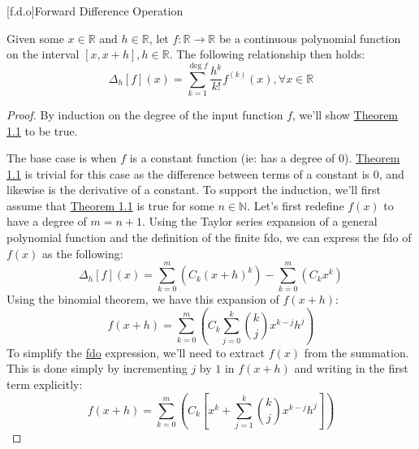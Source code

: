 [f.d.o]{Forward Difference Operation}
\begin{theorem}
  \label{thm:equality-thm}
  Given some $x\in\mathbb{R}$ and $h\in\mathbb{R}$, let $f:\mathbb{R}\to\mathbb{R}$ be a continuous polynomial function on the interval $\left[x, x+h\right],h\in\mathbb{R}$. The following relationship then holds:
  \begin{equation}
    \label{eq:equality-thm}
    \Delta_{h}\left[f\right]\left(x\right)=\sum_{k=1}^{\deg{f}}\frac{h^k}{k!}f^{\left(k\right)}\left(x\right),\forall{x}\in\mathbb{R}
  \end{equation}
\end{theorem}
\begin{proof}
  By induction on the degree of the input function $f$, we'll show \hyperref[thm:equality-thm]{Theorem 1.1} to be true.\par\bigskip The base case is when $f$ is a constant function (ie: has a degree of $0$). \hyperref[thm:equality-thm]{Theorem 1.1} is trivial for this case as the difference between terms of a constant is $0$, and likewise is the derivative of a constant. To support the induction, we'll first assume that \hyperref[thm:equality-thm]{Theorem 1.1} is true for some $n\in\mathbb{N}$. Let's first redefine $f\left(x\right)$ to have a degree of $m=n+1$. Using the Taylor series expansion of a general polynomial function and the definition of the finite \ac{fdo}, we can express the \ac{fdo} of $f\left(x\right)$ as the following:
  \begin{equation}
    \label{eq:fdo-simplification}
    \Delta_{h}\left[f\right]\left(x\right)=\sum_{k=0}^{m}\left(C_k\left(x+h\right)^k\right)-\sum_{k=0}^{m}\left(C_kx^k\right)
  \end{equation}
  Using the binomial theorem, we have this expansion of $f(x+h)$:
  \begin{equation}
    \label{eq:fdo-simplification-2}
    f\left(x+h\right)=\sum_{k=0}^{m}\left(C_k\sum_{j=0}^{k}{k\choose{j}}x^{k-j}h^j\right)
  \end{equation}
  To simplify the \hyperref[eq:fdo-simplification]{\ac{fdo}} expression, we'll need to extract $f\left(x\right)$ from the summation. This is done simply by incrementing $j$ by $1$ in $f\left(x+h\right)$ and writing in the first term explicitly:
  \begin{equation}
    \label{eq:fdo-simplification-3}
    f\left(x+h\right)=\sum_{k=0}^{m}\left(C_k\left[x^k+\sum_{j=1}^{k}{k\choose{j}}x^{k-j}h^j\right]\right)

\end{equation}
\end{proof}
